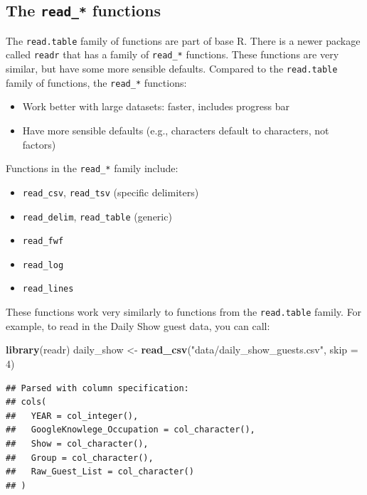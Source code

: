 \documentclass[]{book}
\makeatletter
\newenvironment{Shaded}{\begin{snugshade}}{\end{snugshade}}
\newcommand{\KeywordTok}[1]{\textcolor[rgb]{0.13,0.29,0.53}{\textbf{{#1}}}}
\newcommand{\DataTypeTok}[1]{\textcolor[rgb]{0.13,0.29,0.53}{{#1}}}
\newcommand{\DecValTok}[1]{\textcolor[rgb]{0.00,0.00,0.81}{{#1}}}
\newcommand{\StringTok}[1]{\textcolor[rgb]{0.31,0.60,0.02}{{#1}}}
\newcommand{\NormalTok}[1]{{#1}}
\providecommand{\tightlist}{%
  \setlength{\itemsep}{0pt}\setlength{\parskip}{0pt}}
\newenvironment{kframe}{%
\medskip{}
\setlength{\fboxsep}{.8em}
 \def\at@end@of@kframe{}%
 \ifinner\ifhmode%
  \def\at@end@of@kframe{\end{minipage}}%
  \begin{minipage}{\columnwidth}%
 \fi\fi%
 \def\FrameCommand##1{\hskip\@totalleftmargin \hskip-\fboxsep
 \colorbox{shadecolor}{##1}\hskip-\fboxsep
     \hskip-\linewidth \hskip-\@totalleftmargin \hskip\columnwidth}%
 \MakeFramed {\advance\hsize-\width
   \@totalleftmargin\z@ \linewidth\hsize
   \@setminipage}}%
 {\par\unskip\endMakeFramed%
 \at@end@of@kframe}
\renewenvironment{Shaded}{\begin{kframe}}{\end{kframe}}
\makeatother
\begin{document}
\subsection{\texorpdfstring{The \texttt{read\_*}
functions}{The read\_* functions}}\label{the-readux5f-functions}

The \texttt{read.table} family of functions are part of base R. There is
a newer package called \texttt{readr} that has a family of
\texttt{read\_*} functions. These functions are very similar, but have
some more sensible defaults. Compared to the \texttt{read.table} family
of functions, the \texttt{read\_*} functions:

\begin{itemize}
\tightlist
\item
  Work better with large datasets: faster, includes progress bar
\item
  Have more sensible defaults (e.g., characters default to characters,
  not factors)
\end{itemize}

Functions in the \texttt{read\_*} family include:

\begin{itemize}
\tightlist
\item
  \texttt{read\_csv}, \texttt{read\_tsv} (specific delimiters)
\item
  \texttt{read\_delim}, \texttt{read\_table} (generic)
\item
  \texttt{read\_fwf}
\item
  \texttt{read\_log}
\item
  \texttt{read\_lines}
\end{itemize}

These functions work very similarly to functions from the
\texttt{read.table} family. For example, to read in the Daily Show guest
data, you can call:

\begin{Shaded}
\begin{Highlighting}[]
\KeywordTok{library}\NormalTok{(readr)}
\NormalTok{daily_show <-}\StringTok{ }\KeywordTok{read_csv}\NormalTok{(}\StringTok{"data/daily_show_guests.csv"}\NormalTok{, }\DataTypeTok{skip =} \DecValTok{4}\NormalTok{)}
\end{Highlighting}
\end{Shaded}

\begin{verbatim}
## Parsed with column specification:
## cols(
##   YEAR = col_integer(),
##   GoogleKnowlege_Occupation = col_character(),
##   Show = col_character(),
##   Group = col_character(),
##   Raw_Guest_List = col_character()
## )
\end{verbatim}
\end{document}
